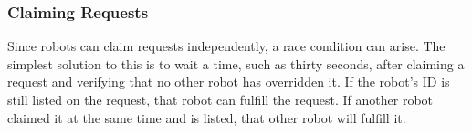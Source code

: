 \documentclass[12pt]{report}
\newcommand{\sectionAuthor}[1]{{\small\vspace{-1em}\textit{#1}}\bigskip\par}
\begin{document}
\subsubsection{Claiming Requests}
Since robots can claim requests independently, a race condition can arise. The simplest solution to this is to wait a time, such as thirty seconds, after claiming a request and verifying that no other robot has overridden it. If the robot's ID is still listed on the request, that robot can fulfill the request. If another robot claimed it at the same time and is listed, that other robot will fulfill it.




\end{document}
